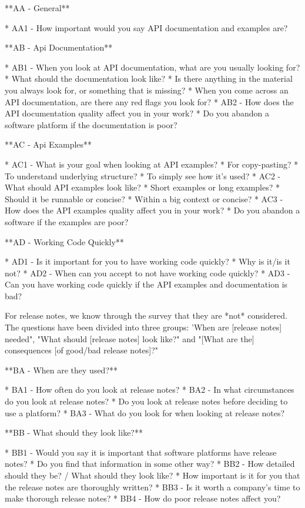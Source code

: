 \documentclass[11pt]{article}
\begin{document}
\begin{multicols}{2}
{    **AA - General**

    * AA1 - How important would you say API documentation and examples are?

    **AB - Api Documentation**

    *	AB1 - When you look at API documentation, what are you usually looking for?
    * What should the documentation look like?
    * Is there anything in the material you always look for, or something that is missing?
    * When you come across an API documentation, are there any red flags you look for?
    *	AB2 - How does the API documentation quality affect you in your work?
    * Do you abandon a software platform if the documentation is poor?

    **AC - Api Examples**

    *	AC1 - What is your goal when looking at API examples?
    * For copy-pasting?
    * To understand underlying structure?
    * To simply see how it's used?
    *   AC2 - What should API examples look like?
    * Short examples or long examples?
    * Should it be runnable or concise?
    * Within a big context or concise?
    *	AC3 - How does the API examples quality affect you in your work?
    * Do you abandon a software if the examples are poor?

    **AD - Working Code Quickly**

    *	AD1 - Is it important for you to have working code quickly?
    *	Why is it/is it not?
    *	AD2 - When can you accept to not have working code quickly?
    *	AD3 - Can you have working code quickly if the API examples and documentation is bad?

    For release notes, we know through the survey that they are *not* considered.
    The questions have been divided into three groups: 'When are [release notes] needed",
    "What should [release notes] look like?" and "[What are the] consequences [of good/bad release notes]?"


    **BA - When are they used?**

    * BA1 - How often do you look at release notes?
    * BA2 - In what circumstances do you look at release notes?
    * Do you look at release notes before deciding to use a platform?
    * BA3 - What do you look for when looking at release notes?

    **BB - What should they look like?**

    * BB1 - Would you say it is important that software platforms have release notes?
    * Do you find that information in some other way?
    * BB2 - How detailed should they be? / What should they look like?
    * How important is it for you that the release notes are thoroughly written?
    * BB3 - Is it worth a company's time to make thorough release notes?
    * BB4 - How do poor release notes affect you?

}
\end{multicols}
\end{document}
